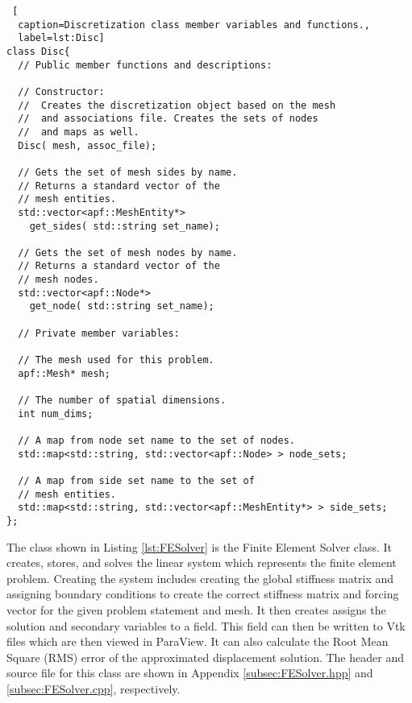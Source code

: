 \documentclass[a4paper, 12pt]{article}
\begin{document}
\begin{lstlisting} [
  caption=Discretization class member variables and functions.,
  label=lst:Disc]
class Disc{
  // Public member functions and descriptions:
  
  // Constructor: 
  //  Creates the discretization object based on the mesh 
  //  and associations file. Creates the sets of nodes 
  //  and maps as well.
  Disc( mesh, assoc_file);

  // Gets the set of mesh sides by name. 
  // Returns a standard vector of the 
  // mesh entities.
  std::vector<apf::MeshEntity*>
    get_sides( std::string set_name);

  // Gets the set of mesh nodes by name. 
  // Returns a standard vector of the 
  // mesh nodes.  
  std::vector<apf::Node*>
    get_node( std::string set_name);

  // Private member variables:
  
  // The mesh used for this problem.
  apf::Mesh* mesh;

  // The number of spatial dimensions.
  int num_dims;

  // A map from node set name to the set of nodes.
  std::map<std::string, std::vector<apf::Node> > node_sets;
  
  // A map from side set name to the set of 
  // mesh entities.
  std::map<std::string, std::vector<apf::MeshEntity*> > side_sets;
};
\end{lstlisting}
\vspace{\baselineskip}

The class shown in Listing 
\ref{lst:FESolver} is the 
Finite Element Solver 
class.  
It creates, stores, and solves the linear system which represents
the finite element problem. Creating the system includes creating the 
global stiffness matrix and assigning boundary conditions to create 
the correct stiffness matrix and forcing vector for the given
problem statement and mesh. It then creates assigns the solution
and secondary variables to a field. This field can then be written 
to Vtk files which are then viewed in ParaView. It can also calculate the
Root Mean Square (RMS) error of the approximated displacement solution.
The header and source file for this class are shown in Appendix 
\ref{subsec:FESolver.hpp} and 
\ref{subsec:FESolver.cpp}, 
respectively.
\end{document}
